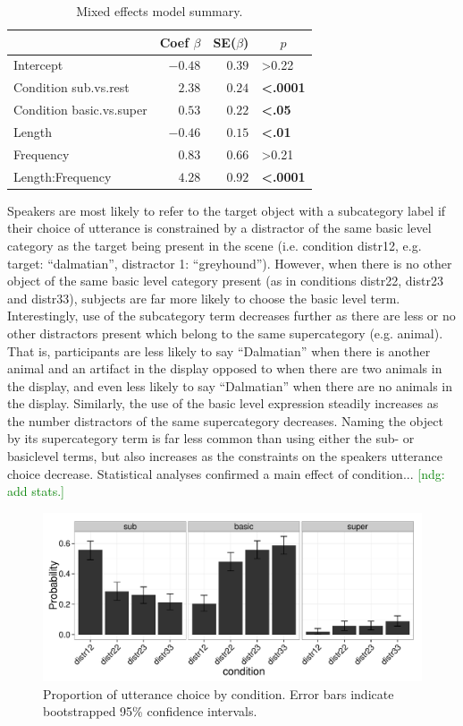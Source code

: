 \documentclass[10pt,letterpaper]{article}
\newcommand{\ndg}[1]{\textcolor{Green}{[ndg: #1]}}
\begin{document}
\begin{table}[!tbp]
\caption{Mixed effects model summary.}
\begin{center}
\begin{tabular}{lrrl}
\toprule
\multicolumn{1}{l}{}&\multicolumn{1}{c}{Coef $\beta$}&\multicolumn{1}{c}{SE($\beta$)}&\multicolumn{1}{c}{$p$}\tabularnewline
\midrule
Intercept&$-0.48$&$0.39$&\textgreater0.22\tabularnewline
Condition sub.vs.rest&$ 2.38$&$0.24$&\textbf{\textless.0001}\tabularnewline
Condition basic.vs.super&$ 0.53$&$0.22$&\textbf{\textless.05}\tabularnewline
Length&$-0.46$&$0.15$&\textbf{\textless.01}\tabularnewline
Frequency&$ 0.83$&$0.66$&\textgreater0.21\tabularnewline
Length:Frequency&$ 4.28$&$0.92$&\textbf{\textless.0001}\tabularnewline
\bottomrule
\end{tabular}\end{center}
\label{tab:modelresults}
\end{table}



Speakers are most  likely to refer to the target object with a subcategory label if their choice of utterance is constrained by a distractor of the same basic level category as the target being present in the scene (i.e. condition distr12, e.g. target: ``dalmatian'', distractor 1: ``greyhound''). However, when there is no other object of the same basic level category present (as in conditions distr22, distr23 and distr33), subjects are far more likely to choose the basic level term. Interestingly, use of the subcategory term decreases further as there are less or no other distractors present which belong to the same supercategory (e.g. animal). That is, participants are less likely to say ``Dalmatian'' when there is another animal and an artifact in the display opposed to when there are two animals in the display, and even less likely to say ``Dalmatian'' when there are no animals in the display. Similarly, the use of the basic level expression steadily increases as the number distractors of the same supercategory decreases. Naming the object by its supercategory term is far less common than using either the sub- or basiclevel terms, but also increases as the constraints on the speakers utterance choice decrease. Statistical analyses confirmed a main effect of condition...
\ndg{add stats.}

\begin{figure}[ht!]
\centering
\includegraphics[width=.5\textwidth]{graphs/proportion_mentioned_features}
\caption{Proportion of utterance choice by condition. Error bars indicate bootstrapped 95\% confidence intervals.}
\label{fig:results1}
\end{figure}
\end{document}
